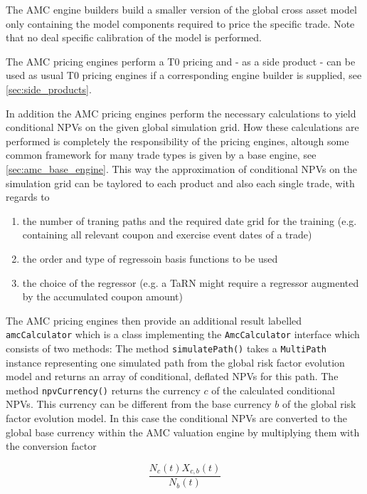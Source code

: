 \documentclass[12pt, a4paper]{article}
\begin{document}
The AMC engine builders build a smaller version of the global cross asset model only containing the model components
required to price the specific trade. Note that no deal specific calibration of the model is performed.

The AMC pricing engines perform a T0 pricing and - as a side product - can be used as usual T0 pricing engines if a
corresponding engine builder is supplied, see \ref{sec:side_products}.

In addition the AMC pricing engines perform the necessary calculations to yield conditional NPVs on the given global
simulation grid. How these calculations are performed is completely the responsibility of the pricing engines, altough
some common framework for many trade types is given by a base engine, see \ref{sec:amc_base_engine}. This way the
approximation of conditional NPVs on the simulation grid can be taylored to each product and also each single trade,
with regards to

\begin{enumerate}
\item the number of traning paths and the required date grid for the training (e.g. containing all relevant coupon and
  exercise event dates of a trade)
\item the order and type of regressoin basis functions to be used
\item the choice of the regressor (e.g. a TaRN might require a regressor augmented by the accumulated coupon amount)
\end{enumerate}

The AMC pricing engines then provide an additional result labelled \verb+amcCalculator+ which is a class implementing
the \verb+AmcCalculator+ interface which consists of two methods: The method \verb+simulatePath()+ takes a
\verb+MultiPath+ instance representing one simulated path from the global risk factor evolution model and returns an
array of conditional, deflated NPVs for this path. The method \verb+npvCurrency()+ returns the currency $c$ of the
calculated conditional NPVs. This currency can be different from the base currency $b$ of the global risk factor
evolution model. In this case the conditional NPVs are converted to the global base currency within the AMC valuation
engine by multiplying them with the conversion factor

\begin{equation}\label{currency_conversion_factor}
\frac{N_c(t) X_{c,b}(t)}{N_b(t)}
\end{equation}
\end{document}
